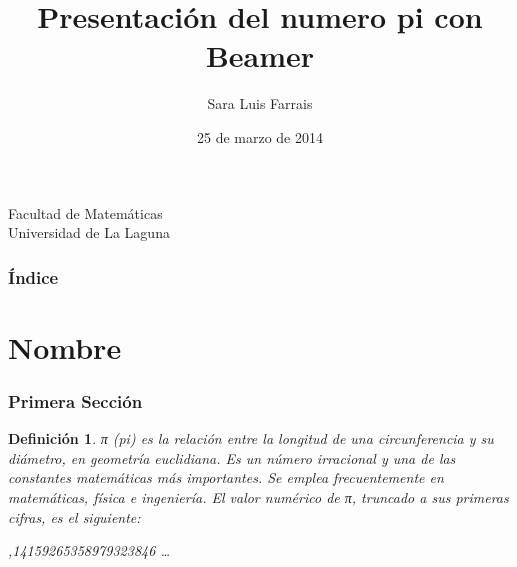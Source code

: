 \documentclass{beamer}
\title[Presentación con Beamer]{Presentación del numero pi con Beamer}
\author[Sara Luis Farrais]{Sara Luis Farrais}
\date[25-03-2014]{25 de marzo de 2014}
\newtheorem{definicion}{Definición}
\begin{document}
  
\begin{frame}

  \hspace*{7.0cm}
  \titlepage

  \begin{small}
    \begin{center}
     Facultad de Matemáticas \\
     Universidad de La Laguna
    \end{center}
  \end{small}

\end{frame}

\begin{frame}
  \frametitle{Índice}  
  \tableofcontents[pausesections]
\end{frame}


\section{Nombre}


\begin{frame}

\frametitle{Primera Sección}

\begin{definicion}

 π (pi) es la relación entre la longitud de una circunferencia y su diámetro, en geometría euclidiana. Es un número irracional y una de las constantes matemáticas más importantes. Se emplea frecuentemente en matemáticas, física e ingeniería. El valor numérico de π, truncado a sus primeras cifras, es el siguiente:

    \pi {},14159265358979323846 \; \dots 

\end{definicion}

\end{frame}
\end{document}
